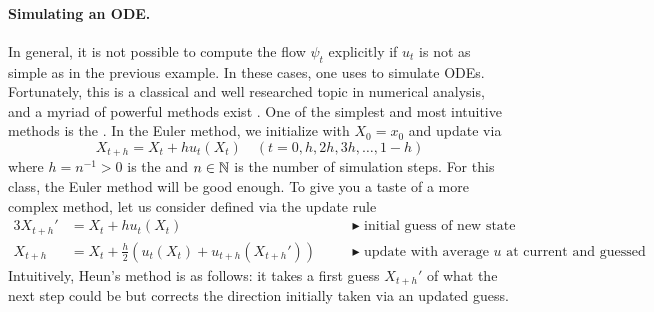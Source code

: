 \paragraph{Simulating an ODE.}
In general, it is not possible to compute the flow $\psi_t$ explicitly if $u_t$ is not as simple as in the previous example. In these cases, one uses  to simulate ODEs. Fortunately, this is a classical and well researched topic in numerical analysis, and a myriad of powerful methods exist \citep{iserles2009first}. One of the simplest and most intuitive methods is the . In the Euler method, we initialize with $X_0=x_0$ and update via
\begin{equation}
\label{e:euler_method}
X_{t+h} = X_t + h u_t(X_t)\quad (t=0,h,2h,3h,\dots,1-h)
\end{equation}
where $h=n^{-1}>0$ is the  and $n \in \mathbb N$ is the number of simulation steps. For this class, the Euler method will be good enough. To give you a taste of a more complex method, let us consider  defined via the update rule
\begin{alignat*}{3}
    X_{t+h}'&=X_t+hu_t(X_t)\quad &&\blacktriangleright\,\, \text{initial guess of new state (same as Euler step)}\\
    X_{t+h} &= X_{t} + \frac{h}{2}(u_t(X_t)+u_{t+h}(X_{t+h}'))\quad &&\blacktriangleright\,\,\text{update with average $u$ at current and guessed state}
\end{alignat*}
Intuitively, Heun's method is as follows: it takes a first guess $X_{t+h}'$ of what the next step could be but corrects the direction initially taken via an updated guess.

